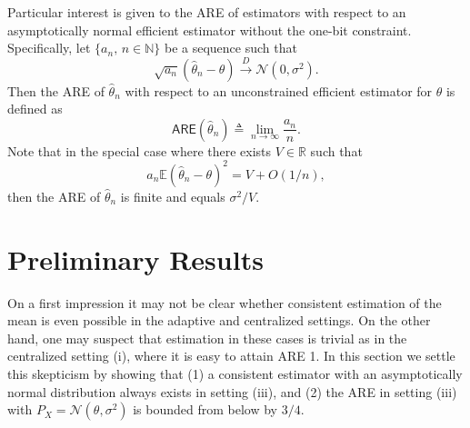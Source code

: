 \documentclass[letterpaper, conference, 11pt]{IEEEtran}      %
\newcommand{\ARE}{\mathsf{ARE}}
\begin{document}
Particular interest is given to the ARE of estimators with respect to an asymptotically normal efficient estimator without the one-bit constraint. Specifically,  let $\{a_n,\,n\in \mathbb N\}$ be a sequence such that 
\[
\sqrt{a_n}\left(\hat{\theta}_n - \theta\right) \overset{D}{\longrightarrow} \mathcal N(0, \sigma^2).
\]
Then the ARE of $\hat{\theta}_n$ with respect to an unconstrained efficient estimator for $\theta$ is defined as \cite[Def. 6.6.6]{lehmann2006theory}
\[
\ARE(\hat{\theta}_n) \triangleq
\lim_{n\rightarrow \infty} \frac{a_n}{n}. 
\]
Note that in the special case where there exists $V \in \mathbb R$ such that
\[
a_n \mathbb E \left(\hat{\theta}_n - \theta \right)^2 = V + O(1/n),
\]
then the ARE of $\hat{\theta}_n$ is finite and equals $\sigma^2/V$. 


\section{Preliminary Results \label{sec:preliminary}}
On a first impression it may not be clear whether consistent estimation of the mean is even possible in the adaptive and centralized settings. On the other hand, one may suspect that estimation in these cases is trivial as in the centralized setting (i), where it is easy to attain ARE 1. In this section we settle this skepticism by showing that (1) a consistent estimator with an asymptotically normal distribution always exists in setting (iii), and (2) the ARE in setting (iii) with $P_X = \mathcal N(\theta, \sigma^2)$ is bounded from below by $3/4$. 
\end{document}
